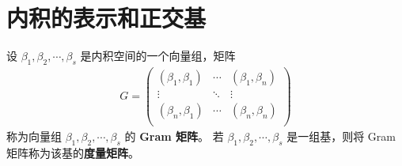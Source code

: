 \documentclass[../../main.tex]{subfiles}%
\begin{document}
\section{内积的表示和正交基}

\begin{definition}[Gram矩阵和度量矩阵]\label{definition:Gram矩阵和度量矩阵}
设 \(\beta_1,\beta_2,\cdots,\beta_s\) 是内积空间的一个向量组，矩阵
\begin{align*}
G=\left( \begin{matrix}
\left( \beta _1,\beta _1 \right)&		\cdots&		\left( \beta _1,\beta _n \right)\\
\vdots&		\ddots&		\vdots\\
\left( \beta _n,\beta _1 \right)&		\cdots&		\left( \beta _n,\beta _n \right)\\
\end{matrix} \right) 
\end{align*}
称为向量组 \(\beta_1,\beta_2,\cdots,\beta_s\) 的 \textbf{Gram 矩阵}。
若 \(\beta_1,\beta_2,\cdots,\beta_s\) 是一组基，则将 Gram 矩阵称为该基的\textbf{度量矩阵}。 
\end{definition}
\end{document}
